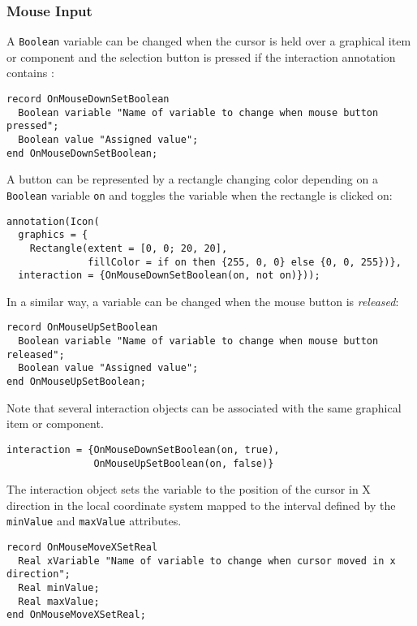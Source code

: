 \subsubsection{Mouse Input}\label{mouse-input}

A \lstinline!Boolean! variable can be changed when the cursor is held over a graphical item or component and the selection button is pressed if the interaction annotation contains :
\begin{lstlisting}[language=modelica]
record OnMouseDownSetBoolean
  Boolean variable "Name of variable to change when mouse button pressed";
  Boolean value "Assigned value";
end OnMouseDownSetBoolean;
\end{lstlisting}

\begin{example}
A button can be represented by a rectangle changing color depending on a \lstinline!Boolean! variable \lstinline!on! and toggles the variable when the rectangle is clicked on:
\begin{lstlisting}[language=modelica]
annotation(Icon(
  graphics = {
    Rectangle(extent = [0, 0; 20, 20],
              fillColor = if on then {255, 0, 0} else {0, 0, 255})},
  interaction = {OnMouseDownSetBoolean(on, not on)}));
\end{lstlisting}
\end{example}

In a similar way, a variable can be changed when the mouse button is \emph{released}:
\begin{lstlisting}[language=modelica]
record OnMouseUpSetBoolean
  Boolean variable "Name of variable to change when mouse button released";
  Boolean value "Assigned value";
end OnMouseUpSetBoolean;
\end{lstlisting}%

Note that several interaction objects can be associated with the same graphical item or component.
\begin{example}
\begin{lstlisting}[language=modelica]
interaction = {OnMouseDownSetBoolean(on, true),
               OnMouseUpSetBoolean(on, false)}
\end{lstlisting}
\end{example}

The  interaction object sets the variable to the position of the cursor in X direction in the local coordinate system mapped to the interval defined by the \lstinline!minValue! and \lstinline!maxValue! attributes.
\begin{lstlisting}[language=modelica]
record OnMouseMoveXSetReal
  Real xVariable "Name of variable to change when cursor moved in x direction";
  Real minValue;
  Real maxValue;
end OnMouseMoveXSetReal;
\end{lstlisting}

